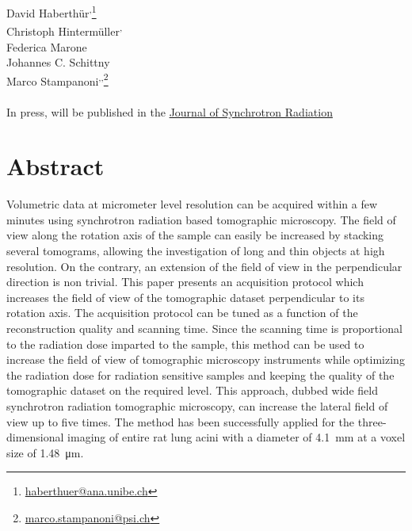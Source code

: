 \acresetall
{}\label{ch:haberthuer2010}

David Haberthür\textsuperscript{,}\footnote{\href{mailto:haberthuer@ana.unibe.ch}{haberthuer@ana.unibe.ch}}\\
Christoph Hintermüller\textsuperscript{,}\\
Federica Marone\\
Johannes C. Schittny\\
Marco Stampanoni\textsuperscript{,}\textsuperscript{,}\footnote{\href{mailto:marco.stampanoni@psi.ch}{marco.stampanoni@psi.ch}}\\
\\
In press, will be published in the \href{http://journals.iucr.org/s/}{Journal of Synchrotron Radiation}\\
\vfill
\section{Abstract}
Volumetric data at micrometer level resolution can be acquired within a few minutes using synchrotron radiation based tomographic microscopy. The field of view along the rotation axis of the sample can easily be increased by stacking several tomograms, allowing the investigation of long and thin objects at high resolution. On the contrary, an extension of the field of view in the perpendicular direction is non trivial. This paper presents an acquisition protocol which increases the field of view of the tomographic dataset perpendicular to its rotation axis. The acquisition protocol can be tuned as a function of the reconstruction quality and scanning time. Since the scanning time is proportional to the radiation dose imparted to the sample, this method can be used to increase the field of view of tomographic microscopy instruments while optimizing the radiation dose for radiation sensitive samples and keeping the quality of the tomographic dataset on the required level. This approach, dubbed wide field synchrotron radiation tomographic microscopy, can increase the lateral field of view up to five times. The method has been successfully applied for the three-dimensional imaging of entire rat lung acini with a diameter of \SI{4.1}{\milli\meter} at a voxel size of \SI{1.48}{\micro\meter}.
\clearpage
